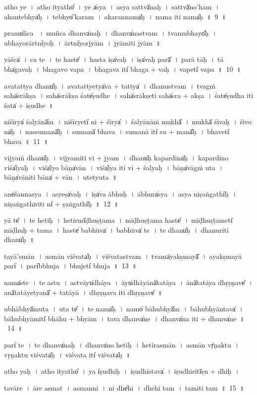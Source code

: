 \documentclass[parskip, DIV=14]{scrartcl}
\begin{document}
{atho॒ ye~। atho॒ ityatho̎~। ye a̍sya~। a॒sya॒  sattvā̍naḥ~। sattvā̍no॒'ham~। a॒hantebhya̍ḥ~। tebhyo̍'karam~। a॒ka॒ra॒nnama̍ḥ~। nama॒ iti॒ nama̍ḥ~॥~9~॥

pramu̍ñca ~। mu॒ñca॒  dhanva̍naḥ~। dhanva̍na॒stvam~। tvamu॒bhayo̎ḥ~। u॒bhayo॒rārtni̍yoḥ~। ārtni̍yo॒rjyām~। jyāmiti॒ jyām~॥

yā॒śca̍~। ca॒ te॒~। te॒ haste̎~। hasta॒ iṣa̍vaḥ~। iṣa̍va॒ḥ parā̎~। parā॒ tāḥ~। tā bha̍gavaḥ~। bha॒ga॒vo॒ va॒pa॒~। bha॒ga॒va॒ iti̍ bhaga + va॒ḥ~। va॒peti̍  vapa~॥~10~॥

a॒va॒tattya॒ dhanu̍ḥ~। a॒va॒tattyetya̍va + tattya̍~। dhanu॒stvam~। tvagṁ saha̍srākṣa~। saha̍srākṣa॒ śate̍ṣudhe~। saha̍srā॒kṣeti॒ saha̍sra + a॒kṣa॒~। śate̍ṣudha॒ iti॒ śata̍ + i॒ṣu॒dhe॒~॥ 

ni॒śīrya̍ śa॒lyānā̎m~। ni॒śīryeti̍ ni + śīrya̍~। śa॒lyānā॒ṁ mukhā̎~। mukhā̍ śi॒vaḥ~। śi॒vo na̍ḥ~। na॒ssu॒manā̎ḥ~। su॒manā̍ bhava~। su॒manā॒ iti̍ su + manā̎ḥ~। bha॒veti̍ bhava~॥~11~॥


vijya॒ṁ dhanu̍ḥ~। vijya॒miti॒ vi + jya॒m~। dhanu̍ḥ kapa॒rdina̍ḥ~। ka॒pa॒rdino॒ viśa̍lyaḥ~। viśa̍lyo॒ bāṇa̍vān~। viśa̍lya॒ iti॒ vi + śa॒lya॒ḥ~। bāṇa̍vāgṁ u॒ta~। bāṇa̍vā॒niti॒ bāna̍ + vā॒n॒~। u॒tetyu॒ta~॥ 

ane̍śannasya~। a॒syeṣa̍vaḥ~। iṣa̍va ā॒bhuḥ~। ā॒bhura̍sya~। a॒sya॒ ni॒ṣa॒ṅgathi̍ḥ~। ni॒ṣa॒ṅgathi॒riti॒ ni̍  + ṣa॒ṅgathi̍ḥ~॥~12~॥  %
 

yā te̎~। te॒  he॒tiḥ~। he॒tirmī̍ḍhuṣṭama~। mī॒ḍhu॒ṣṭa॒ma॒ haste̎~। mī॒ḍhu॒ṣṭa॒meti̍ mīḍhuḥ + ta॒ma॒~। haste̍ ba॒bhūva̍~। ba॒bhūva̍ te~। te॒ dhanu̍ḥ~। dha॒nuriti॒ dhanu̍ḥ~॥ 

tayā॒'smān~। a॒smān vi॒śvata̍ḥ~। vi॒śvata॒stvam~। tvama̍ya॒kṣmayā̎~। a॒ya॒kṣmayā॒ pari̍~। pari̍bbhuja~। bhu॒jeti̍ bhuja~॥~13~॥

nama̍ste~। te॒ a॒stu॒~। a॒stvāyu̍dhāya~। āyu̍dhā॒yānā̍tatāya~। ānā̍tatāya dhṛ॒ṣṇave̎~। anā̍tatā॒yetyanā̎ + ta॒tā॒yā॒~। dhṛ॒ṣṇava॒ iti॒  dhṛṣṇave̎~॥ 

u॒bhābhyā̍mu॒ta~। u॒ta te̎~। te॒ nama̍ḥ~। namo̍  bā॒hubhyā̎m~। bā॒hubhyā॒ntava̍~। bā॒hubhyā॒miti̍ bhā॒hu + bhyā॒m~। tava॒ dhanva̍ne~। dhanva̍na iti॒ + dhanva̍ne~॥~14~॥


pari̍ te~। te॒ dhanva̍naḥ~। dhanva̍no he॒tiḥ~। he॒tira॒smān~। a॒smān vṛ̍ṇaktu~। vṛ॒ṇa॒ktu॒ vi॒śvata̍ḥ~। vi॒śvata॒ iti̍  vi॒śvata̍ḥ~॥ 

atho॒ yaḥ~। atho॒ ityatho̎~। ya i̍ṣu॒dhiḥ~। i॒ṣu॒dhistava̍~। i॒ṣu॒dhiritī̍ṣu + dhiḥ~।

tavā॒re~। ā॒re a॒smat~। a॒smanni~। ni dhe̍hi~। dhe॒hi॒ tam~। tamiti॒ tam~॥~15~॥

}
\end{document}
